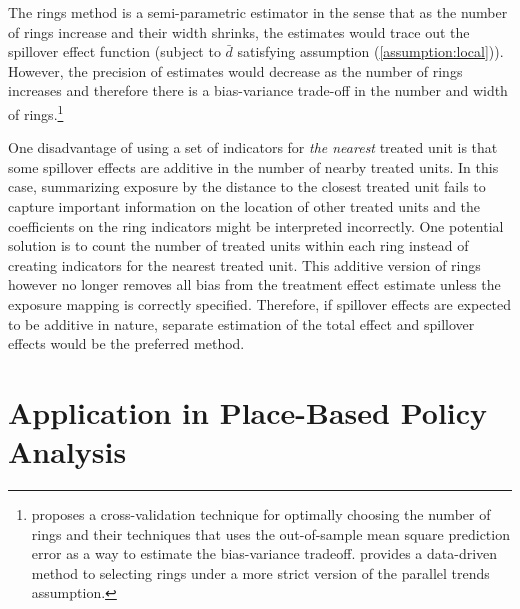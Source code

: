\documentclass[11pt]{article}
\begin{document}
The rings method is a semi-parametric estimator in the sense that as the number of rings increase and their width shrinks, the estimates would trace out the spillover effect function (subject to $\bar{d}$ satisfying assumption (\ref{assumption:local})). However, the precision of estimates would decrease as the number of rings increases and therefore there is a bias-variance trade-off in the number and width of rings.\footnote{\citet{Clarke_2017} proposes a cross-validation technique for optimally choosing the number of rings and their techniques that uses the out-of-sample mean square prediction error as a way to estimate the bias-variance tradeoff. \citet{Butts_2021} provides a data-driven method to selecting rings under a more strict version of the parallel trends assumption.} 

One disadvantage of using a set of indicators for \textit{the nearest} treated unit is that some spillover effects are additive in the number of nearby treated units. In this case, summarizing exposure by the distance to the closest treated unit fails to capture important information on the location of other treated units and the coefficients on the ring indicators might be interpreted incorrectly. One potential solution is to count the number of treated units within each ring instead of creating indicators for the nearest treated unit. This additive version of rings however no longer removes all bias from the treatment effect estimate unless the exposure mapping is correctly specified. Therefore, if spillover effects are expected to be additive in nature, separate estimation of the total effect and spillover effects would be the preferred method. 

\section{Application in Place-Based Policy Analysis}
\label{sec:tva}
\end{document}
